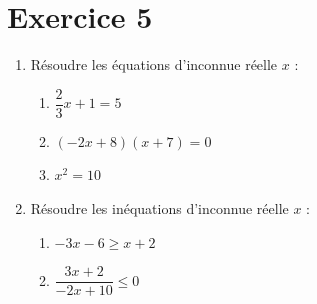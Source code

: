 \documentclass[12pt]{article}
\begin{document}
\section*{Exercice 5}

\begin{enumerate}
    \item Résoudre les équations d'inconnue réelle $x$ :

    \begin{enumerate}
        \item $\dfrac{2}{3}x + 1 = 5$
        {\color{red} }

        \item $(-2x + 8)(x + 7) = 0$
        {\color{red} }

        \item $x^2 = 10$
        {\color{red} }
    \end{enumerate}

    \item Résoudre les inéquations d'inconnue réelle $x$ :

    \begin{enumerate}
        \item $-3x - 6 \geq x + 2$
        {\color{red} \boxed{x \leq -2 \hspace{1cm} S=]-\infty;-2]}}

        \item $\dfrac{3x + 2}{-2x + 10} \leq 0$
        {\color{red} \boxed{x \in \left]-\infty; -\dfrac{2}{3}\right] \cup \left[5; +\infty\right[}}
    \end{enumerate}
\end{enumerate}
\end{document}

